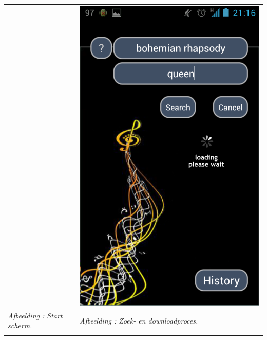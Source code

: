 \documentclass[11pt,a4paper]{article}
\newcounter{figc}
\newcommand{\figID} {%
   \stepcounter{figc}%
   \thefigc}
\begin{document}
{\begin{tabular} {p{7cm} >{\centering\arraybackslash}p{7cm}@{\hskip 0.5in}}
		&  
		 \includegraphics[scale=0.28]{Pictures/Screenshot_2013-05-24-21-16-07.png} 
		\\
		
		\centering \small \textit{Afbeelding \figID : Start scherm.}  \normalsize
		&  \small \textit{Afbeelding \figID : Zoek- en downloadproces.} \\  \normalsize
		
		\vspace{1pt} & \vspace{1pt} \\
		

\end{tabular}}
\end{document}
